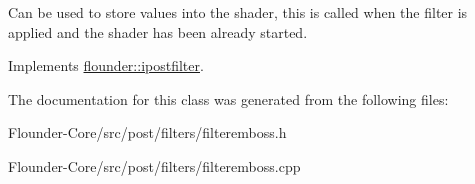 Can be used to store values into the shader, this is called when the filter is applied and the shader has been already started. 



Implements \hyperlink{classflounder_1_1ipostfilter_a9b658b4672718d5ac36539875bde722e}{flounder\+::ipostfilter}.



The documentation for this class was generated from the following files\+:\begin{DoxyCompactItemize}
\item 
Flounder-\/\+Core/src/post/filters/filteremboss.\+h\item 
Flounder-\/\+Core/src/post/filters/filteremboss.\+cpp\end{DoxyCompactItemize}
